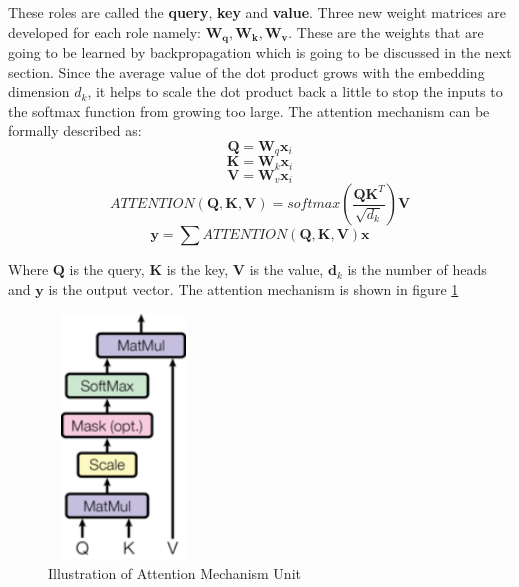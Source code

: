 These roles are called the \textbf{query}, \textbf{key} and \textbf{value}. Three new weight matrices are developed for each role namely: $\mathbf{W_q}, \mathbf{W_k}, \mathbf{W_v}$. These are the weights that are going to be learned by backpropagation which is going to be discussed in the next section. Since the average value of the dot product grows with the embedding dimension $d_k$, it helps to scale the dot product back a little to stop the inputs to the softmax function from growing too large.
  The attention mechanism can be formally described as:
\begin{equation}
\mathbf{Q} = \mathbf{W}_q \mathbf{x}_i
\end{equation}
\begin{equation}
    \mathbf{K} = \mathbf{W}_k \mathbf{x}_i
\end{equation}
\begin{equation}
    \mathbf{V} = \mathbf{W}_v \mathbf{x}_i 
\end{equation}
\begin{equation}
    ATTENTION(\mathbf{Q,K,V}) = softmax(\frac{\mathbf{Q} \mathbf{K}^T}{\sqrt{d_k}})\mathbf{V}
\end{equation}
\begin{equation}
    \mathbf{y} = \sum ATTENTION(\mathbf{Q,K,V})\mathbf{x}    
\end{equation}

Where $\mathbf{Q}$ is the query,  $\mathbf{K}$ is the key, $\mathbf{V}$ is the value, $\mathbf{d}_k$ is the number of heads and  $\mathbf{y}$ is the output vector. The attention mechanism is shown in figure \ref{fig:attention-unit}

\begin{figure}[ht]
\includegraphics[width=4.0cm, height=6.5cm]{images/attention unit.png}
\centering
\caption{Illustration of Attention Mechanism Unit \protect\cite{attention-is-all-you-need}}
\label{fig:attention-unit}
\end{figure}
\FloatBarrier


